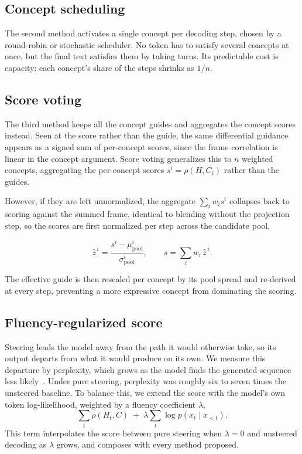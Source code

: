 \documentclass[a4paper,10pt,twocolumn]{article}
\begin{document}
\subsection{Concept scheduling}
The second method activates a single concept per decoding step, chosen by a round-robin or stochastic scheduler. No token has to satisfy several concepts at once, but the final text satisfies them by taking turns. Its predictable cost is capacity: each concept's share of the steps shrinks as $1/n$.

\subsection{Score voting}
The third method keeps all the concept guides and aggregates the concept scores instead. Seen at the score rather than the guide, the same differential guidance appears as a signed sum of per-concept scores, since the frame correlation is linear in the concept argument. Score voting generalizes this to $n$ weighted concepts, aggregating the per-concept scores $s^{i} = \rho(H, C_i)$ rather than the guides. 

However, if they are left unnormalized, the aggregate $\sum_i w_i s^{i}$ collapses back to scoring against the summed frame, identical to blending without the projection step, so the scores are first normalized per step across the candidate pool, 

\begin{equation}
\hat{z}^{\,i} = \frac{s^{i} - \mu^{i}_{\mathrm{pool}}}{\sigma^{i}_{\mathrm{pool}}},
\qquad s = \textstyle\sum_i w_i\, \hat{z}^{\,i}.
\end{equation}

The effective guide is then rescaled per concept by its pool spread and re-derived at every step, preventing a more expressive concept from dominating the scoring.

\subsection{Fluency-regularized score}
Steering leads the model away from the path it would otherwise take, so its output departs from what it would produce on its own. We measure this departure by perplexity, which grows as the model finds the generated sequence less likely~\cite{jelinek1977perplexity}. Under pure steering, perplexity was roughly six to seven times the unsteered baseline. To balance this, we extend the score with the model's own token log-likelihood, weighted by a fluency coefficient $\lambda$,
\begin{equation}
\textstyle\sum_t \rho(H_t, C) \;+\; \lambda \sum_t \log p(x_t \mid x_{<t}).
\end{equation}
This term interpolates the score between pure steering when $\lambda = 0$ and unsteered decoding as $\lambda$ grows, and composes with every method proposed.
\end{document}
